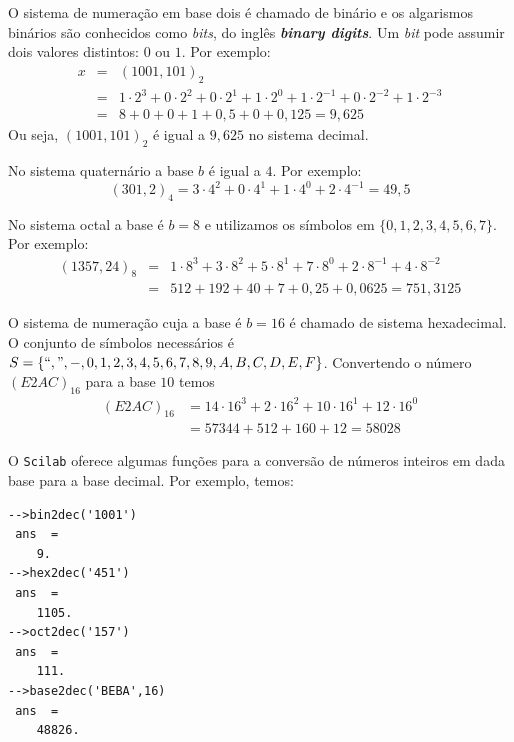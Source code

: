 \documentclass[main.tex]{subfiles}
\begin{document}
\begin{ex} O sistema de numeração em base dois é chamado de binário e os algarismos binários são conhecidos como \textit{bits}, do inglês \textit{\bf{b}inary dig\bf{its}}. Um \textit{bit} pode assumir dois valores distintos: $0$ ou $1$. Por exemplo:
\begin{eqnarray*}
x &=& (1001,101)_{2} \\
  &=& 1\cdot 2^3 +0\cdot 2^2 +0\cdot 2^1 +1\cdot 2^0  +1\cdot 2^{-1} +0\cdot 2^{-2} +1\cdot 2^{-3} \\
  &=& 8+0+0+1+ 0,5+0+0,125 = 9,625
\end{eqnarray*}
Ou seja, $(1001,101)_{2}$ é igual a $9,625$ no sistema decimal.
\end{ex}


\begin{ex}
No sistema quaternário a base $b$ é igual a $4$. Por exemplo:
  \begin{equation*}
    (301,2)_{4}=3\cdot 4^2+0\cdot 4^1+1\cdot 4^0+2\cdot 4^{-1}=49,5    
  \end{equation*}
\end{ex}

\begin{ex}
No sistema octal a base é $b=8$ e utilizamos os símbolos em $\{0, 1, 2, 3, 4, 5, 6, 7\}$. Por exemplo:
\begin{eqnarray*}
(1357,24)_{8}&=&1\cdot 8^3+3\cdot 8^2+5\cdot 8^1+7\cdot 8^{0}+2\cdot 8^{-1}+4\cdot 8^{-2}\\
             &=&512+192+40+7+0,25+0,0625=751,3125
\end{eqnarray*}
\end{ex}

\begin{ex} O sistema de numeração cuja a base é $b=16$ é chamado de sistema hexadecimal. O conjunto de símbolos necessários é  $S=\{``,", -, 0, 1, 2, 3, 4, 5, 6, 7, 8, 9, A, B, C, D, E, F\}$. Convertendo o número $(E2AC)_{16}$ para a base $10$ temos
\begin{align*}
  (E2AC)_{16} &= 14\cdot 16^3+2\cdot 16^2+10\cdot 16^1+12\cdot 16^{0}\\
  &=57344+512+160+12=58028
\end{align*}
\end{ex}

\ifisscilab
\begin{ex}[Scilab]
  O \verb+Scilab+ oferece algumas funções para a conversão de números inteiros em dada base para a base decimal. Por exemplo, temos:
\begin{verbatim}
-->bin2dec('1001')
 ans  =
    9.  
-->hex2dec('451')
 ans  =
    1105.  
-->oct2dec('157')
 ans  =
    111.
-->base2dec('BEBA',16)
 ans  =
    48826.  
\end{verbatim}
\end{ex}
\fi
\end{document}

